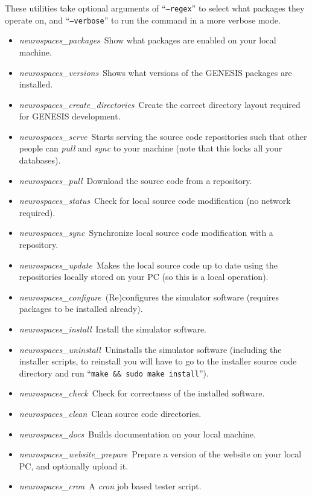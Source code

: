\documentclass[12pt]{article}
\begin{document}
These utilities take optional arguments of ``{\tt --regex}'' to select what packages they operate on, and ``{\tt --verbose}'' to run the command in a more verbose mode. 
\begin{itemize}
	\item {\it neurospaces\_packages}\,\,\,Show what packages are enabled on your local machine.
	\item {\it neurospaces\_versions}\,\,\,Shows what versions of the GENESIS packages are installed.
	\item {\it neurospaces\_create\_directories}\,\,\,Create the correct directory layout required for GENESIS development. 
\end{itemize}
\begin{itemize}
	\item {\it neurospaces\_serve}\,\,\,Starts serving the source code repositories such that other people can {\it pull} and {\it sync} to your machine (note that this locks all your databases).
	\item {\it neurospaces\_pull}\,\,\,Download the source code from a repository.
	\item {\it neurospaces\_status}\,\,\,Check for local source code modification (no network required).
	\item {\it neurospaces\_sync}\,\,\,Synchronize local source code modification with a repository.
	\item {\it neurospaces\_update}\,\,\,Makes the local source code up to date using the repositories locally stored on your PC (so this is a local operation). 
\end{itemize}
\begin{itemize}
	\item {\it neurospaces\_configure}\,\,\,(Re)configures the simulator software (requires packages to be installed already).
	\item {\it neurospaces\_install}\,\,\,Install the simulator software.
	\item {\it neurospaces\_uninstall}\,\,\,Uninstalls the simulator software (including the installer scripts, to reinstall you will have to go to the installer source code directory and run ``{\tt make \&\& sudo make install}'').
	\item {\it neurospaces\_check}\,\,\,Check for correctness of the installed software.
	\item {\it neurospaces\_clean}\,\,\,Clean source code directories. 
\end{itemize}
\begin{itemize}
	\item {\it neurospaces\_docs}\,\,\,Builds documentation on your local machine.
	\item {\it neurospaces\_website\_prepare}\,\,\,Prepare a version of the website on your local PC, and optionally upload it. 
\end{itemize}
\begin{itemize}
	\item {\it neurospaces\_cron}\,\,\,A {\it cron} job based tester script. 
\end{itemize}
\end{document}
